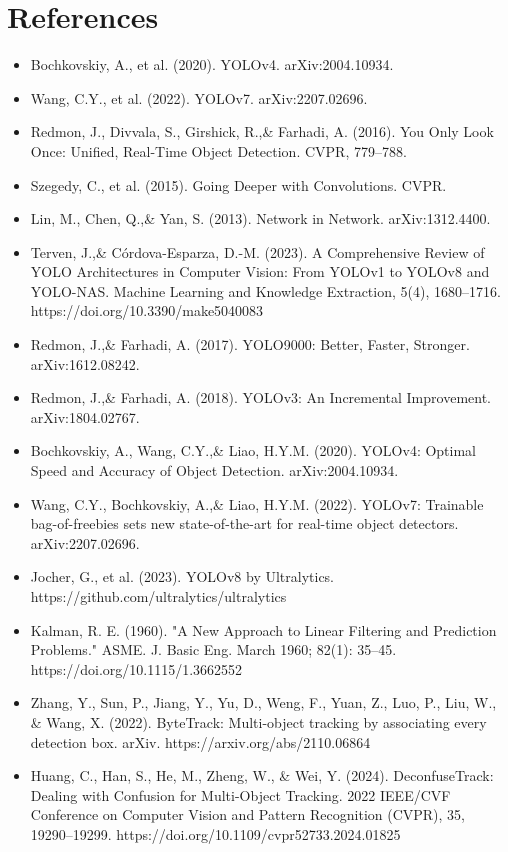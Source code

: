 \documentclass[11pt]{article}
\begin{document}
\section{References}
\begin{itemize}
    \item Bochkovskiy, A., et al. (2020). YOLOv4. arXiv:2004.10934.
    \item Wang, C.Y., et al. (2022). YOLOv7. arXiv:2207.02696.
    \item Redmon, J., Divvala, S., Girshick, R.,\& Farhadi, A. (2016). You Only Look Once: Unified, Real-Time Object Detection. CVPR, 779–788.
    \item Szegedy, C., et al. (2015). Going Deeper with Convolutions. CVPR.
    \item Lin, M., Chen, Q.,\& Yan, S. (2013). Network in Network. arXiv:1312.4400.
    \item Terven, J.,\& Córdova-Esparza, D.-M. (2023). A Comprehensive Review of YOLO Architectures in Computer Vision: From YOLOv1 to YOLOv8 and YOLO-NAS. Machine Learning and Knowledge Extraction, 5(4), 1680–1716. https://doi.org/10.3390/make5040083
    \item Redmon, J.,\& Farhadi, A. (2017). YOLO9000: Better, Faster, Stronger. arXiv:1612.08242.
    \item Redmon, J.,\& Farhadi, A. (2018). YOLOv3: An Incremental Improvement. arXiv:1804.02767.
    \item Bochkovskiy, A., Wang, C.Y.,\& Liao, H.Y.M. (2020). YOLOv4: Optimal Speed and Accuracy of Object Detection. arXiv:2004.10934.
    \item Wang, C.Y., Bochkovskiy, A.,\& Liao, H.Y.M. (2022). YOLOv7: Trainable bag-of-freebies sets new state-of-the-art for real-time object detectors. arXiv:2207.02696.
    \item Jocher, G., et al. (2023). YOLOv8 by Ultralytics. https://github.com/ultralytics/ultralytics 
    \item Kalman, R. E. (1960). "A New Approach to Linear Filtering and Prediction Problems." ASME. J. Basic Eng. March 1960; 82(1): 35–45. https://doi.org/10.1115/1.3662552
    \item Zhang, Y., Sun, P., Jiang, Y., Yu, D., Weng, F., Yuan, Z., Luo, P., Liu, W., \& Wang, X. (2022). ByteTrack: Multi-object tracking by associating every detection box. arXiv. https://arxiv.org/abs/2110.06864
    \item Huang, C., Han, S., He, M., Zheng, W., \& Wei, Y. (2024). DeconfuseTrack: Dealing with Confusion for Multi-Object Tracking. 2022 IEEE/CVF Conference on Computer Vision and Pattern Recognition (CVPR), 35, 19290–19299. https://doi.org/10.1109/cvpr52733.2024.01825

\end{itemize}
\end{document}
